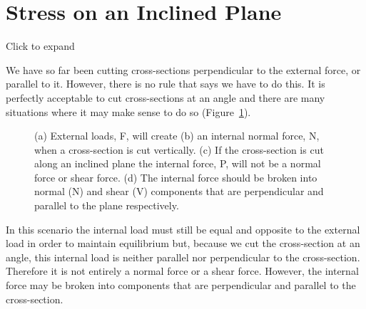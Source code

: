 \documentclass[
  letterpaper,
  DIV=11,
  numbers=noendperiod]{scrreprt}
\theoremstyle{definition}
\theoremstyle{remark}
\begin{document}
\section{Stress on an Inclined Plane}\label{sec-2.4}

Click to expand

We have so far been cutting cross-sections perpendicular to the external
force, or parallel to it. However, there is no rule that says we have to
do this. It is perfectly acceptable to cut cross-sections at an angle
and there are many situations where it may make sense to do so
(Figure~\ref{fig-2.7}).

\begin{figure}


\caption{\label{fig-2.7}(a) External loads, F, will create (b) an
internal normal force, N, when a cross-section is cut vertically. (c) If
the cross-section is cut along an inclined plane the internal force, P,
will not be a normal force or shear force. (d) The internal force should
be broken into normal (N) and shear (V) components that are
perpendicular and parallel to the plane respectively.}

\end{figure}%

In this scenario the internal load must still be equal and opposite to
the external load in order to maintain equilibrium but, because we cut
the cross-section at an angle, this internal load is neither parallel
nor perpendicular to the cross-section. Therefore it is not entirely a
normal force or a shear force. However, the internal force may be broken
into components that are perpendicular and parallel to the
cross-section.
\end{document}
